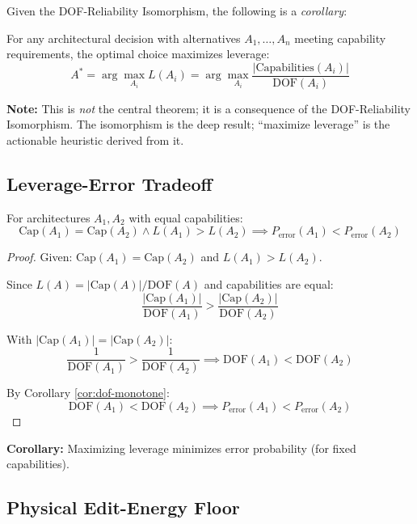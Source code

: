 Given the DOF-Reliability Isomorphism, the following is a \emph{corollary}:

\begin{theorem}\label{thm:leverage-max}
For any architectural decision with alternatives $A_1, \ldots, A_n$ meeting capability requirements, the optimal choice maximizes leverage:
\[
A^* = \arg\max_{A_i} L(A_i) = \arg\max_{A_i} \frac{|\text{Capabilities}(A_i)|}{\text{DOF}(A_i)}
\]
\end{theorem}

\textbf{Note:} This is \emph{not} the central theorem; it is a consequence of the DOF-Reliability Isomorphism. The isomorphism is the deep result; ``maximize leverage'' is the actionable heuristic derived from it.

\subsection{Leverage-Error Tradeoff}

\begin{theorem}\label{thm:leverage-error}
For architectures $A_1, A_2$ with equal capabilities:
\[
\text{Cap}(A_1) = \text{Cap}(A_2) \wedge L(A_1) > L(A_2) \implies P_{\text{error}}(A_1) < P_{\text{error}}(A_2)
\]
\end{theorem}

\begin{proof}
Given: $\text{Cap}(A_1) = \text{Cap}(A_2)$ and $L(A_1) > L(A_2)$.

Since $L(A) = |\text{Cap}(A)|/\text{DOF}(A)$ and capabilities are equal:
\[
\frac{|\text{Cap}(A_1)|}{\text{DOF}(A_1)} > \frac{|\text{Cap}(A_2)|}{\text{DOF}(A_2)}
\]

With $|\text{Cap}(A_1)| = |\text{Cap}(A_2)|$:
\[
\frac{1}{\text{DOF}(A_1)} > \frac{1}{\text{DOF}(A_2)} \implies \text{DOF}(A_1) < \text{DOF}(A_2)
\]

By Corollary \ref{cor:dof-monotone}:
\[
\text{DOF}(A_1) < \text{DOF}(A_2) \implies P_{\text{error}}(A_1) < P_{\text{error}}(A_2)
\]
\end{proof}

\textbf{Corollary:} Maximizing leverage minimizes error probability (for fixed capabilities).

\subsection{Physical Edit-Energy Floor}

